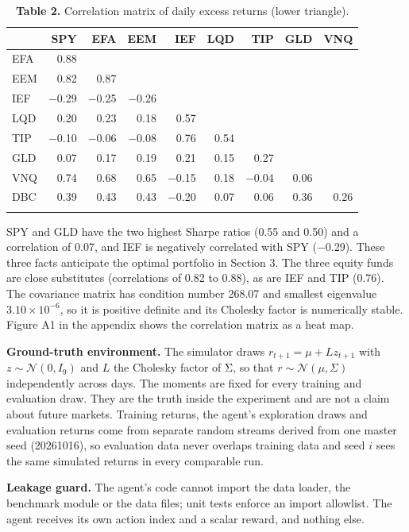 \documentclass[
  11pt]{article}
\begin{document}
\begin{table}[htbp]
\centering\small
\caption{\textbf{Table 2.} Correlation matrix of daily excess returns
(lower triangle).}
\begin{tabular}{@{}lrrrrrrrr@{}}
\toprule\noalign{}
& SPY & EFA & EEM & IEF & LQD & TIP & GLD & VNQ \\
\midrule\noalign{}
EFA & 0.88 & & & & & & & \\
EEM & 0.82 & 0.87 & & & & & & \\
IEF & −0.29 & −0.25 & −0.26 & & & & & \\
LQD & 0.20 & 0.23 & 0.18 & 0.57 & & & & \\
TIP & −0.10 & −0.06 & −0.08 & 0.76 & 0.54 & & & \\
GLD & 0.07 & 0.17 & 0.19 & 0.21 & 0.15 & 0.27 & & \\
VNQ & 0.74 & 0.68 & 0.65 & −0.15 & 0.18 & −0.04 & 0.06 & \\
DBC & 0.39 & 0.43 & 0.43 & −0.20 & 0.07 & 0.06 & 0.36 & 0.26 \\
\bottomrule\noalign{}
\end{tabular}
\end{table}

SPY and GLD have the two highest Sharpe ratios (0.55 and 0.50) and a
correlation of 0.07, and IEF is negatively correlated with SPY (−0.29).
These three facts anticipate the optimal portfolio in Section 3. The
three equity funds are close substitutes (correlations of 0.82 to 0.88),
as are IEF and TIP (0.76). The covariance matrix has condition number
268.07 and smallest eigenvalue \(3.10 \times 10^{-6}\), so it is
positive definite and its Cholesky factor is numerically stable. Figure
A1 in the appendix shows the correlation matrix as a heat map.

\textbf{Ground-truth environment.} The simulator draws
\(r_{t+1} = \mu + L z_{t+1}\) with \(z \sim \mathcal{N}(0, I_9)\) and
\(L\) the Cholesky factor of Σ, so that
\(r \sim \mathcal{N}(\mu, \Sigma)\) independently across days. The
moments are fixed for every training and evaluation draw. They are the
truth inside the experiment and are not a claim about future markets.
Training returns, the agent's exploration draws and evaluation returns
come from separate random streams derived from one master seed
(20261016), so evaluation data never overlaps training data and seed
\(i\) sees the same simulated returns in every comparable run.

\textbf{Leakage guard.} The agent's code cannot import the data loader,
the benchmark module or the data files; unit tests enforce an import
allowlist. The agent receives its own action index and a scalar reward,
and nothing else.
\end{document}
